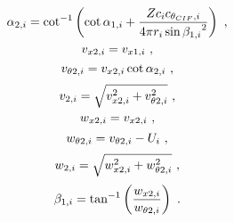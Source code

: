 \begin{equation}{\label{eq:downstream_alpha_angle}}
	\alpha_{2,i} = \cot^{-1}\left(\cot{\alpha_{1,i}} + \frac{Zc_{i}c_{\theta_{CIF},i}}{4\pi{r_{i}}\sin{\beta_{1,i}}^{2}}\right) \ ,
\end{equation}
\begin{equation}{\label{eq:downstream_axial_component_of_absolute_velocity}}
	v_{x2,i} = v_{x1,i} \ ,
\end{equation}
\begin{equation}{\label{eq:downstream_tangential_component_of_absolute_velocity}}
	v_{\theta2,i} = v_{x2,i}\cot{\alpha_{2,i}} \ ,
\end{equation}
\begin{equation}{\label{eq:downstream_absolute_velocity}}
	v_{2,i} = \sqrt{v_{x2,i}^{2} + v_{\theta2,i}^{2}} \ ,
\end{equation}
\begin{equation}{\label{eq:downstream_axial_component_of_relative_velocity}}
	w_{x2,i} = v_{x2,i} \ ,
\end{equation}
\begin{equation}{\label{eq:downstream_tangential_component_of_relative_velocity}}
	w_{\theta2,i} = v_{\theta2,i} - U_{i} \ ,
\end{equation}
\begin{equation}{\label{eq:downstream_relative_velocity}}
	w_{2,i} = \sqrt{w_{x2,i}^{2} + w_{\theta2,i}^{2}} \ ,
\end{equation}
\begin{equation}{\label{eq:downstream_beta_angle}}
	\beta_{1,i} = \tan^{-1}\left(\frac{w_{x2,i}}{w_{\theta2,i}}\right) \ .
\end{equation}

